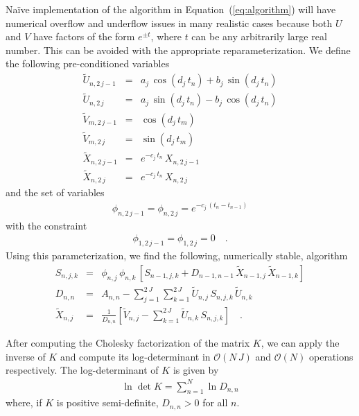 \documentclass[manuscript, letterpaper]{aastex6}
\makeatletter
\let\origsubsection\subsection
\renewcommand\subsection{\@ifstar{\starsubsection}{\nostarsubsection}}
\newcommand\nostarsubsection[1]{\subsectionprelude\origsubsection{#1}}
\newcommand\starsubsection[1]{\subsectionprelude\origsubsection*{#1}}
\newcommand\subsectionprelude{\vspace{1em}}
\renewcommand{\eqref}[1]{\ref{eq:#1}}
\newcommand{\Eq}[1]{Equation~(\eqref{#1})}
\newcommand{\eq}[1]{\Eq{#1}}
\makeatother
\begin{document}
Na\"ive implementation of the algorithm in \eq{algorithm} will have numerical
overflow and underflow issues in many realistic cases because both $U$ and $V$
have factors of the form $e^{\pm t}$, where $t$ can be any arbitrarily large
real number.
This can be avoided with the appropriate reparameterization.
We define the following pre-conditioned variables
\begin{eqnarray}
\tilde{U}_{n,2\,j-1} &=& a_j\,\cos(d_j\,t_n) + b_j\,\sin(d_j\,t_n) \\
\tilde{U}_{n,2\,j} &=& a_j\,\sin(d_j\,t_n) - b_j\,\cos(d_j\,t_n) \\
\tilde{V}_{m,2\,j-1} &=& \cos(d_j\,t_m) \\
\tilde{V}_{m,2\,j} &=& \sin(d_j\,t_m) \\
\tilde{X}_{n,2\,j-1} &=& e^{-c_j\,t_n}\,X_{n,2\,j-1} \\
\tilde{X}_{n,2\,j} &=& e^{-c_j\,t_n}\,X_{n,2\,j}
\end{eqnarray}
and the set of variables
\begin{eqnarray}
\phi_{n,2\,j-1} = \phi_{n,2\,j} = e^{-c_j\,(t_n - t_{n-1})}
\end{eqnarray}
with the constraint
\begin{eqnarray}
\phi_{1,2\,j-1} = \phi_{1,2\,j} = 0 \quad.
\end{eqnarray}
Using this parameterization, we find the following, numerically stable,
algorithm
\begin{eqnarray}
    S_{n,j,k} &=& \phi_{n,j}\,\phi_{n,k}\,\left[S_{n-1,j,k} +
    D_{n-1,n-1}\,\tilde{X}_{n-1,j}\,\tilde{X}_{n-1,k}\right] \nonumber\\
D_{n,n} &=& A_{n,n} -
    \sum_{j=1}^{2\,J}\sum_{k=1}^{2\,J} \tilde{U}_{n,j}\,S_{n,j,k}\,\tilde{U}_{n,k}
    \nonumber\\
\tilde{X}_{n,j} &=& \frac{1}{D_{n,n}}\left[ \tilde{V}_{n,j} -
    \sum_{k=1}^{2\,J}\tilde{U}_{n,k}\,S_{n,j,k} \right] \quad.
\end{eqnarray}

\subsection{Solving}

After computing the Cholesky factorization of the matrix $K$, we can apply
the inverse of $K$ and compute its log-determinant in $\mathcal{O}(N\,J)$ and
$\mathcal{O}(N)$ operations respectively.
The log-determinant of $K$ is given by
\begin{eqnarray}
    \ln \det K = \sum_{n=1}^N \ln D_{n,n}
\end{eqnarray}
where, if $K$ is positive semi-definite, $D_{n,n}>0$ for all $n$.
\end{document}
